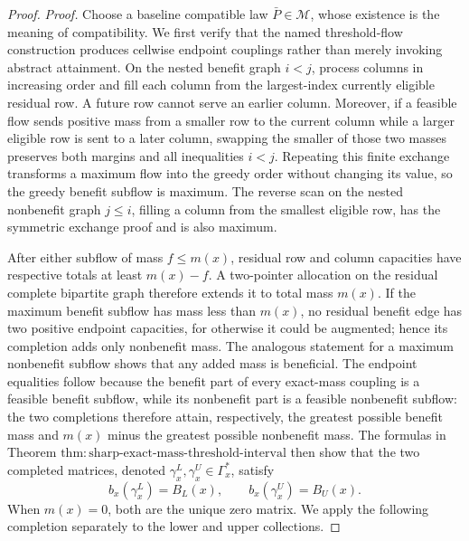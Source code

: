 \documentclass{article}
\begin{document}
\begin{proof}
\noindent\textit{Proof.}
Choose a baseline compatible law \(\bar P\in\mathcal M\), whose existence
is the meaning of compatibility.  We first verify that the named
threshold-flow construction produces cellwise endpoint couplings rather
than merely invoking abstract attainment.  On the nested benefit graph
\(i<j\), process columns in increasing order and fill each column from
the largest-index currently eligible residual row.  A future row cannot
serve an earlier column.  Moreover, if a feasible flow sends positive
mass from a smaller row to the current column while a larger eligible row
is sent to a later column, swapping the smaller of those two masses
preserves both margins and all inequalities \(i<j\).  Repeating this
finite exchange transforms a maximum flow into the greedy order without
changing its value, so the greedy benefit subflow is maximum.  The
reverse scan on the nested nonbenefit graph \(j\le i\), filling a column
from the smallest eligible row, has the symmetric exchange proof and is
also maximum.

After either subflow of mass \(f\le m(x)\), residual row and column
capacities have respective totals at least \(m(x)-f\).  A two-pointer
allocation on the residual complete bipartite graph therefore extends it
to total mass \(m(x)\).  If the maximum benefit subflow has mass less than
\(m(x)\), no residual benefit edge has two positive endpoint capacities,
for otherwise it could be augmented; hence its completion adds only
nonbenefit mass.  The analogous statement for a maximum nonbenefit
subflow shows that any added mass is beneficial.  The endpoint equalities
follow because the benefit part of every exact-mass coupling is a feasible
benefit subflow, while its nonbenefit part is a feasible nonbenefit
subflow: the two completions therefore attain, respectively, the greatest
possible benefit mass and \(m(x)\) minus the greatest possible nonbenefit
mass.  The formulas in Theorem
\(\mathrm{thm{:}sharp\text{-}exact\text{-}mass\text{-}threshold\text{-}interval}\)
then show that the two completed matrices, denoted
\(\gamma_x^L,\gamma_x^U\in\Gamma_x^{\ast}\), satisfy
\[
b_x(\gamma_x^L)=B_L(x),\qquad
b_x(\gamma_x^U)=B_U(x).
\tag{1}
\]
When \(m(x)=0\), both are the unique zero matrix.  We apply the following
completion separately to the lower and upper collections.


\end{proof}
\end{document}
